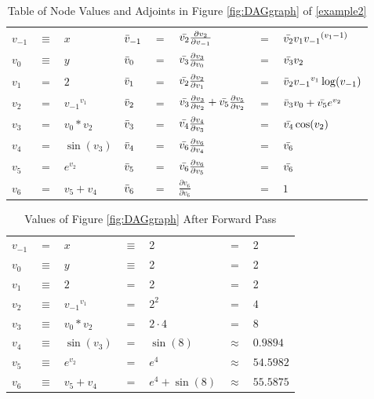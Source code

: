 \documentclass{article}
\begin{document}
\begin{table}[h!]
    \centering
    \begin{tabular}{|lcl|lclll|}
        \hline
        $v_{-1}$ & $\equiv$ & $x$ & $\Bar{v}_{-1}$ & $=$ & $\Bar{v_2}\frac{\partial{v_2}}{\partial{v_{-1}}}$ & $=$ & $\Bar{v_2}v_1 {v_{-1}}^{(v_{1}-1)}$\\
        $v_{0}$ & $\equiv$ & $y$ & $\Bar{v}_{0}$ & $=$ & $\Bar{v_3}\frac{\partial{v_3}}{\partial{v_0}}$ & $=$ & $\Bar{v_3}v_2$\\
        \hline
        $v_{1}$ & $=$ & $2$ & $\Bar{v}_{1}$ & $=$ & $\Bar{v_2}\frac{\partial{v_2}}{\partial{v_1}}$ & $=$ & $\Bar{v}_{2}{v_{-1}}^{v_{1}}\log(v_{-1})$\\
        $v_{2}$ & $=$ & ${v_{-1}}^{v_{1}}$ & $\Bar{v}_{2}$ & $=$ & $\Bar{v_3}\frac{\partial{v_3}}{\partial{v_2}} + \Bar{v_5}\frac{\partial{v_5}}{\partial{v_2}}$ & $=$ & $\Bar{v}_{3}v_0 + \Bar{v_5}e^{v_2}$\\
        $v_{3}$ & $=$ & ${v_{0}}*{v_{2}}$ & $\Bar{v}_{3}$ & $=$ & $\Bar{v_4}\frac{\partial{v_4}}{\partial{v_3}}$ & $=$ & $\Bar{v_4}\cos(v_2)$\\
        $v_{4}$ & $=$ & $\sin(v_3)$ & $\Bar{v}_{4}$ & $=$ & $\Bar{v_6}\frac{\partial{v_6}}{\partial{v_4}}$ & $=$ & $\Bar{v_6}$\\
        $v_{5}$ & $=$ & $e^{v_2}$ & $\Bar{v}_{5}$ & $=$ & $\Bar{v_6}\frac{\partial{v_6}}{\partial{v_5}}$ & $=$ & $\Bar{v_6}$\\
        \hline
        $v_{6}$ & $=$ & $v_5 + v_4$ & $\Bar{v}_{6}$ & $=$ & $\frac{\partial{v_6}}{\partial{v_6}}$ & $=$ & $1$\\
        \hline
    \end{tabular}
    \caption{Table of Node Values and Adjoints in Figure \ref{fig:DAGgraph} of \eqref{example2}}
    \label{tab:example1}
\end{table}

\begin{table}[h!]
    \centering
    \begin{tabular}{|lclllcl|}
        \hline
        $v_{-1}$ & $=$ & $x$ & $\equiv$ & 2 & $=$ & 2\\
        $v_{0}$ & $\equiv$ & $y$ & $\equiv$ & 2 & $=$ & 2\\
        \hline
        $v_{1}$ & $\equiv$ & $2$ & $=$ & 2 & $=$ & 2\\
        $v_{2}$ & $\equiv$ & ${v_{-1}}^{v_{1}}$ & $=$ & $ 2^2$ & $=$ & $4$\\
        $v_{3}$ & $\equiv$ & $v_0 * v_2$ & $=$ & $ 2 \cdot 4$ & $=$ & $8$\\
        $v_{4}$ & $\equiv$ & $\sin(v_3)$ & $=$ & $\sin(8)$ & $\approx$ & $0.9894$\\
        $v_{5}$ & $\equiv$ & $e^{v_2}$ & $=$ & $ e^4$ & $\approx$ & $54.5982$\\
        \hline
        $v_{6}$ & $\equiv$ & $v_5 + v_4$ & $=$ & $e^4 + \sin(8)$ & $\approx$ & $55.5875$\\
        \hline
    \end{tabular}
    \caption{Values of Figure \ref{fig:DAGgraph} After Forward Pass}
    \label{tab:example1FP}
\end{table}
\end{document}
